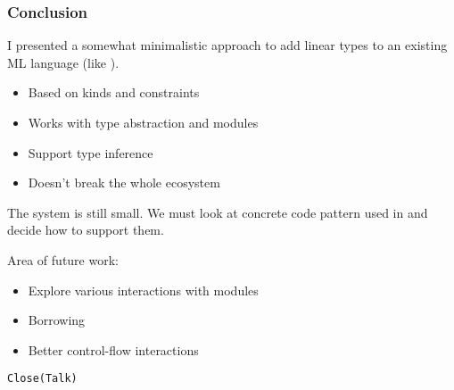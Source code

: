 \documentclass[xcolor=svgnames,11pt]{beamer}
\begin{document}

\begin{frame}
  \frametitle{Conclusion}

  I presented a somewhat minimalistic approach to add linear types to an existing ML language (like \ocaml).

  \begin{itemize}
  \item Based on kinds and constraints
  \item Works with type abstraction and modules
  \item Support type inference
  \item Doesn't break the whole ecosystem
  \end{itemize}

  The system is still small. We must look at concrete code pattern used in \ocaml and decide how to support them.
  
  Area of future work:
  \begin{itemize}
  \item Explore various interactions with modules
  \item Borrowing
  \item Better control-flow interactions
  \end{itemize}
\end{frame}



\begin{frame}
  \Huge{\texttt{Close(Talk)}}
\end{frame}


\end{document}
